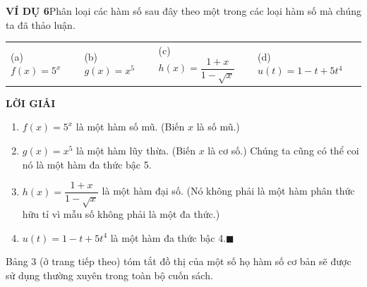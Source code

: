 \begin{minipage}[t]{0.708\textwidth}
    \vspace{0.6em}
    \noindent\textbf{\textsf{\color{stewartcyan}VÍ DỤ 6}}\quad Phân loại các hàm số sau đây theo một trong các loại hàm số mà chúng ta đã thảo luận.

    \vspace{0.2em}
    \noindent
    \begin{tabular*}{\linewidth}{@{\extracolsep{\fill}}llll@{}}
    (a) $f(x) = 5^x$ & (b) $g(x) = x^5$ & (c) $h(x) = \dfrac{1 + x}{1 - \sqrt{x}}$ & (d) $u(t) = 1 - t + 5t^4$
    \end{tabular*}

    \vspace{0.4em}
    \noindent\textbf{\textsf{\color{stewartcyan}LỜI GIẢI}}
    \begin{enumerate}[label=(\alph*), leftmargin=*, itemsep=2pt, topsep=2pt]
        \item $f(x) = 5^x$ là một hàm số mũ. (Biến $x$ là số mũ.)
        \item $g(x) = x^5$ là một hàm lũy thừa. (Biến $x$ là cơ số.) Chúng ta cũng có thể coi nó là một hàm đa thức bậc 5.
        \item $h(x) = \dfrac{1 + x}{1 - \sqrt{x}}$ là một hàm đại số. (Nó không phải là một hàm phân thức hữu tỉ vì mẫu số không phải là một đa thức.)
        \item $u(t) = 1 - t + 5t^4$ là một hàm đa thức bậc 4.\hfill{\color{stewartcyan}$\blacksquare$}
    \end{enumerate}

    \vspace{0.3em}
    Bảng 3 (ở trang tiếp theo) tóm tắt đồ thị của một số họ hàm số cơ bản sẽ được sử dụng thường xuyên trong toàn bộ cuốn sách.
\end{minipage}